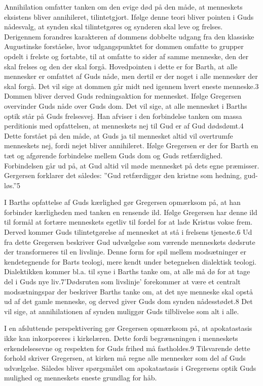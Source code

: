 Annihilation omfatter tanken om den evige død på den måde, at menneskets eksistens bliver annihileret, tilintetgjort. Ifølge denne teori bliver pointen i Guds nådesvalg, at synden skal tilintetgøres og synderen skal leve og frelses. Derigennem forandres karakteren af dommens dobbelte udgang fra den klassiske Augustinske forståelse, hvor udgangspunktet for dommen omfatte to grupper opdelt i frelste og fortabte, til at omfatte to sider af samme menneske, den der skal frelses og den der skal forgå. Hovedpointen i dette er for Barth, at alle mennesker er omfattet af Guds nåde, men dertil er der noget i alle mennesker der skal forgå. Det vil sige at dommen går midt ned igennem hvert eneste menneske.3 Dommen bliver derved Guds redningsaktion for mennesket. Ifølge Gregersen overvinder Guds nåde over Guds dom. Det vil sige, at alle mennesket i Barths optik står på Guds frelsesvej. Han afviser i den forbindelse tanken om massa perditionis med opfattelsen, at menneskets nej til Gud er af Gud dødsdømt.4 Dette forstået på den måde, at Guds ja til mennesket altid vil overtrumfe menneskets nej, fordi nejet bliver annihileret. Ifølge Gregersen er der for Barth en tæt og afgørende forbindelse mellem Guds dom og Guds retfærdighed. Forbindelsen går ud på, at Gud altid vil møde mennesket på dets egne præmisser. Gergersen forklarer det således: ”Gud retfærdiggør den kristne som hedning, gud-løs.”5 

I Barths opfattelse af Guds kærlighed gør Gregersen opmærksom på, at han forbinder kærligheden med tanken en rensende ild. Ifølge Gregersen har denne ild til formål at fortære menneskets egetliv til fordel for at lade Kristus vokse frem. Derved kommer Guds tilintetgørelse af mennesket at stå i frelsens tjeneste.6 Ud fra dette Gregersen beskriver Gud udvælgelse som værende menneskets dødsrute der transformeres til en livslinje. Denne form for spil mellem modsætninger er kendetegnende for Barts teologi, mere kendt under betegnelsen dialektisk teologi. Dialektikken kommer bl.a. til syne i Barths tanke om, at alle må dø for at tage del i Guds nye liv.7’Dødsruten som livslinje’ forekommer at være et centralt modsætningspar der beskriver Barths tanke om, at det nye menneske skal opstå ud af det gamle menneske, og derved giver Guds dom synden nådesstødet.8 Det vil sige, at annihilationen af synden muliggør Guds tilblivelse som alt i alle. 

I en afsluttende perspektivering gør Gregersen opmærksom på, at apokatastasis ikke kan inkorporeres i kirkelæren. Dette fordi begrænsningen i menneskets erkendelsesevne og respekten for Guds frihed må fastholdes.9 Tilsvarende dette forhold skriver Gregersen, at kirken må regne alle mennesker som del af Guds udvælgelse. Således bliver spørgsmålet om apokatastasis i Gregersens optik Guds mulighed og menneskets eneste grundlag for håb. 